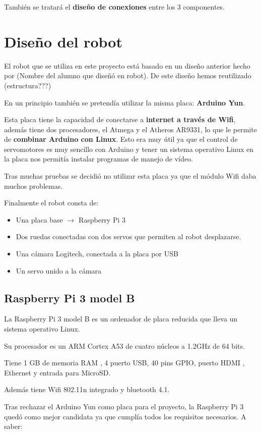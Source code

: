 \documentclass[twoside, 11pt]{epstfg}
\begin{document}
También se tratará el \textbf{diseño de conexiones} entre los 3 componentes.

\section{Diseño del robot}

El robot que se utiliza en este proyecto está basado en un diseño anterior hecho por (Nombre del alumno que diseñó en robot). De este diseño hemos reutilizado (estructura???)

En un principio también se pretendía utilizar la misma placa: \textbf{Arduino Yun}.

Esta placa tiene la capacidad de conectarse a \textbf{internet a través de Wifi}, además tiene dos procesadores, el Atmega y el Atheros AR9331, lo que le permite de \textbf{combinar Arduino con Linux}. Esto era muy útil ya que el control de servomotores es muy sencillo con Arduino y tener un sistema operativo Linux en la placa nos permitía instalar programas de manejo de vídeo.

Tras muchas pruebas se decidió no utilizar esta placa ya que el módulo Wifi daba muchos problemas.

Finalmente el robot consta de:
\begin{itemize}
	\item Una placa base $\rightarrow$ Raspberry Pi 3
	\item Dos ruedas conectadas con dos servos que permiten al robot desplazarse.
	\item Una cámara Logitech, conectada a la placa por USB
	\item Un servo unido a la cámara 
\end{itemize}




\subsection{Raspberry Pi 3 model B}
La Raspberry Pi 3 model B es un ordenador de placa reducida que lleva un sistema operativo Linux.

Su procesador es un ARM Cortex A53 de cuatro núcleos a 1.2GHz de 64 bits.

Tiene 1 GB de memoria RAM , 4 puerto USB, 40 pins GPIO, puerto HDMI , Ethernet y entrada para MicroSD.

Además tiene Wifi 802.11n integrado y bluetooth 4.1.

Tras rechazar el Arduino Yun como placa para el proyecto, la Raspberry Pi 3 quedó como mejor candidata ya que cumplía todos los requisitos necesarios. A saber:
\end{document}
